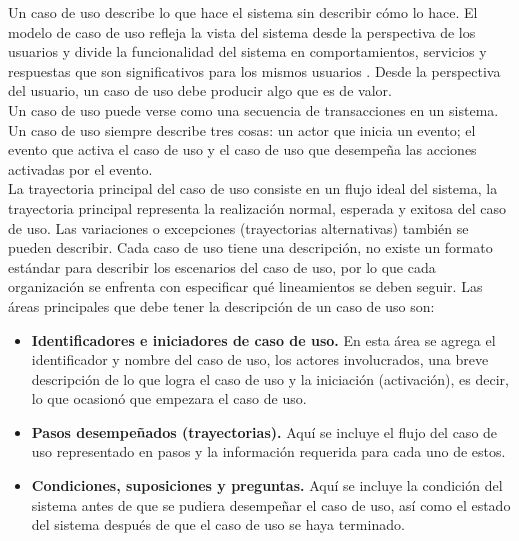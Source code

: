 Un caso de uso describe lo que hace el sistema sin describir cómo lo hace. El modelo de caso de uso refleja la 
vista del sistema desde la perspectiva de los usuarios y divide la funcionalidad del sistema en comportamientos, servicios y respuestas que son 
significativos para los mismos usuarios \cite{kendall2005analisis}. Desde la perspectiva del usuario, un caso de uso debe producir algo que es de valor.\\

Un caso de uso puede verse como una secuencia de transacciones en un sistema. Un caso de uso siempre describe tres cosas: un actor que inicia un evento; 
el evento que activa el caso de uso y el caso de uso que desempeña las acciones activadas
por el evento.\\

La trayectoria principal del caso de uso consiste en un flujo ideal del sistema, la trayectoria principal representa la realización normal, esperada y exitosa del caso de uso. Las variaciones o excepciones (trayectorias alternativas) también 
se pueden describir. Cada caso de uso tiene una descripción, no existe un formato estándar para describir los escenarios del caso de uso, por lo que cada organización se enfrenta con especificar qué lineamientos se deben seguir. Las áreas principales 
que debe tener la descripción de un caso de uso son:
\begin{itemize}
 \item {\bf Identificadores e iniciadores de caso de uso.} En esta área se agrega el identificador y nombre del caso de uso, los actores involucrados, una breve descripción de lo que logra el caso de uso y la iniciación (activación), es decir, lo que ocasionó que empezara el caso de uso.
 \item {\bf Pasos desempeñados (trayectorias).} Aquí se incluye el flujo del caso de uso representado en pasos y la información requerida para cada uno de estos.
 \item {\bf Condiciones, suposiciones y preguntas.} Aquí se incluye la condición del sistema antes de que se pudiera desempeñar el caso de uso, así como el estado del sistema después de que el caso de uso se haya terminado.
\end{itemize}

